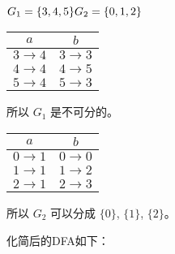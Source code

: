 \documentclass[a4paper, body={18cm,22cm}]{article}
\begin{document}
\begin{enumerate}
        $G_1 = \{3,4,5\} \\
        G_2 = \{0,1,2\} \\
        $

        \begin{table}[h]
            \begin{tabular}{cc}
                $a$ & $b$ \\
                \hline
                $3 \to 4$ & $3 \to 3$ \\
                $4 \to 4$ & $4 \to 5$ \\
                $5 \to 4$ & $5 \to 3$ \\
            \end{tabular}
        \end{table}

        所以 $G_1$ 是不可分的。

        \begin{table}[h]
            \begin{tabular}{cc}
                $a$ & $b$ \\
                \hline
                $0 \to 1$ & $0 \to 0$ \\
                $1 \to 1$ & $1 \to 2$ \\
                $2 \to 1$ & $2 \to 3$ \\
            \end{tabular}
        \end{table}

        所以 $G_2$ 可以分成 $\{0\}$, $\{1\}$, $\{2\}$。


        化简后的DFA如下：


\end{enumerate}
\end{document}
